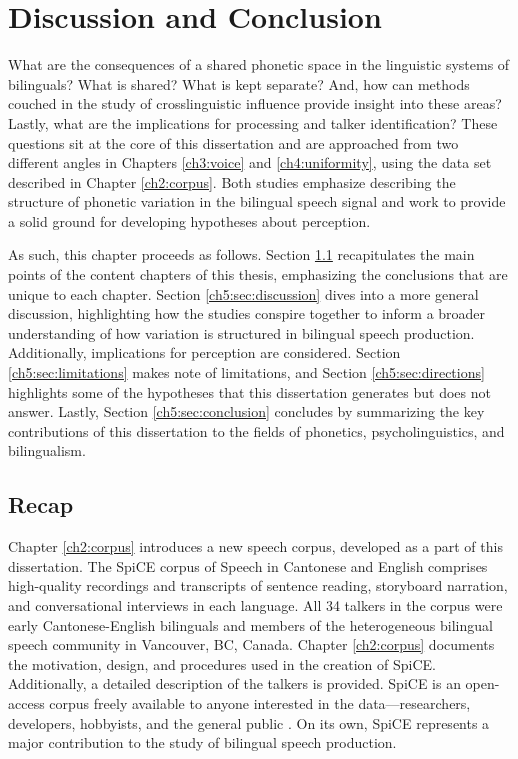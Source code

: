 
\chapter{Discussion and Conclusion}\label{ch5:discussion}

What are the consequences of a shared phonetic space in the linguistic systems of bilinguals? What is shared? What is kept separate? And, how can methods couched in the study of crosslinguistic influence provide insight into these areas? Lastly, what are the implications for processing and talker identification? These questions sit at the core of this dissertation and are approached from two different angles in Chapters \ref{ch3:voice} and \ref{ch4:uniformity}, using the data set described in Chapter \ref{ch2:corpus}. Both studies emphasize describing the structure of phonetic variation in the bilingual speech signal and work to provide a solid ground for developing hypotheses about perception. 

As such, this chapter proceeds as follows. Section \ref{ch5:sec:recap} recapitulates the main points of the content chapters of this thesis, emphasizing the conclusions that are unique to each chapter. Section \ref{ch5:sec:discussion} dives into a more general discussion, highlighting how the studies conspire together to inform a broader understanding of how variation is structured in bilingual speech production. Additionally, implications for perception are considered. Section \ref{ch5:sec:limitations} makes note of limitations, and Section \ref{ch5:sec:directions} highlights some of the hypotheses that this dissertation generates but does not answer. Lastly, Section \ref{ch5:sec:conclusion} concludes by summarizing the key contributions of this dissertation to the fields of phonetics, psycholinguistics, and bilingualism.

\section{Recap}\label{ch5:sec:recap}

Chapter \ref{ch2:corpus} introduces a new speech corpus, developed as a part of this dissertation. The SpiCE corpus of Speech in Cantonese and English comprises high-quality recordings and transcripts of sentence reading, storyboard narration, and conversational interviews in each language. All 34 talkers in the corpus were early Cantonese-English bilinguals and members of the heterogeneous bilingual speech community in Vancouver, BC, Canada. Chapter \ref{ch2:corpus} documents the motivation, design, and procedures used in the creation of SpiCE. Additionally, a detailed description of the talkers is provided. SpiCE is an open-access corpus freely available to anyone interested in the data---researchers, developers, hobbyists, and the general public \citep{johnson_2021_spice}. On its own, SpiCE represents a major contribution to the study of bilingual speech production. 

